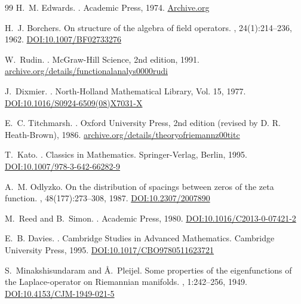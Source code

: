 \documentclass{article}
\numberwithin{equation}{section}
\theoremstyle{plain}
\theoremstyle{definition}
\theoremstyle{remark}
\begin{document}
\begin{thebibliography}{99}
H.~M. Edwards.
.
\newblock Academic Press, 1974.
\href{https://archive.org/details/riemannszetafunc0000edwa}{Archive.org}

H.~J. Borchers.
\newblock On structure of the algebra of field operators.
, 24(1):214--236, 1962.
\href{https://doi.org/10.1007/BF02733276}{DOI:10.1007/BF02733276}

W.~Rudin.
.
\newblock McGraw-Hill Science, 2nd edition, 1991.
\href{https://archive.org/details/functionalanalys0000rudi}{archive.org/details/functionalanalys0000rudi}

J.~Dixmier.
.
\newblock North-Holland Mathematical Library, Vol. 15, 1977.
\href{https://doi.org/10.1016/S0924-6509(08)X7031-X}{DOI:10.1016/S0924-6509(08)X7031-X}

E.~C. Titchmarsh.
.
\newblock Oxford University Press, 2nd edition (revised by D. R. Heath-Brown), 1986.
\href{https://archive.org/details/theoryofriemannz00titc}{archive.org/details/theoryofriemannz00titc}

T.~Kato.
.
\newblock Classics in Mathematics. Springer-Verlag, Berlin, 1995.
\href{https://doi.org/10.1007/978-3-642-66282-9}{DOI:10.1007/978-3-642-66282-9}

A.~M. Odlyzko.
\newblock On the distribution of spacings between zeros of the zeta function.
, 48(177):273--308, 1987.
\href{https://doi.org/10.2307/2007890}{DOI:10.2307/2007890}

M.~Reed and B.~Simon.
.
\newblock Academic Press, 1980.
\href{https://doi.org/10.1016/C2013-0-07421-2}{DOI:10.1016/C2013-0-07421-2}

E.~B. Davies.
.
\newblock Cambridge Studies in Advanced Mathematics. Cambridge University Press, 1995.
\href{https://doi.org/10.1017/CBO9780511623721}{DOI:10.1017/CBO9780511623721}

S.~Minakshisundaram and {\AA}.~Pleijel.
\newblock Some properties of the eigenfunctions of the Laplace-operator on Riemannian manifolds.
, 1:242--256, 1949.
\href{https://doi.org/10.4153/CJM-1949-021-5}{DOI:10.4153/CJM-1949-021-5}


\end{thebibliography}
\end{document}
